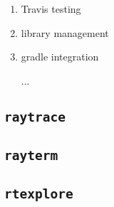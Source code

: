 \begin{enumerate}
  \item Travis testing
  \item library management
  \item gradle integration
  \item [...]
\end{enumerate}

\subsection{\texttt{raytrace}}\label{ch:implementation:final:raytrace}

\subsection{\texttt{rayterm}}\label{ch:implementation:final:rayterm}

\subsection{\texttt{rtexplore}}\label{ch:implementation:final:rtexplore}
